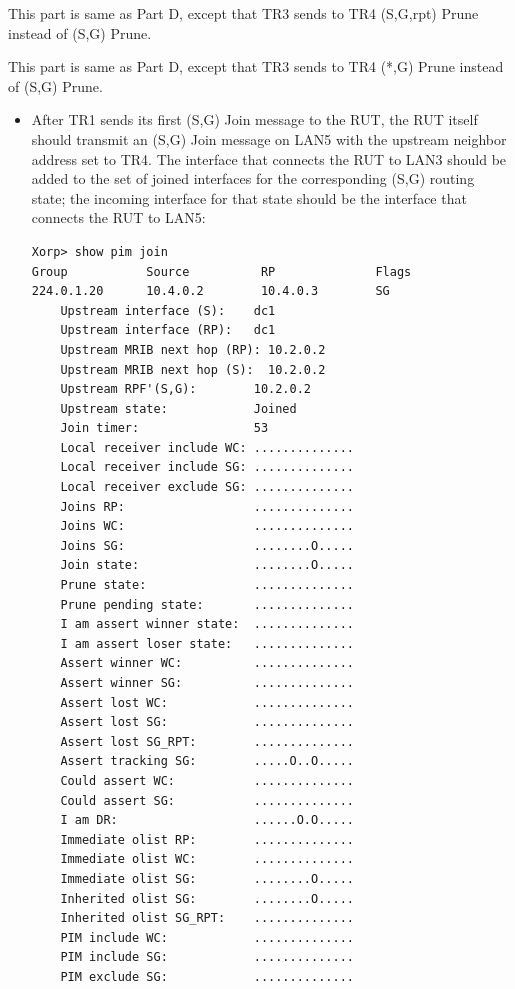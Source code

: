 \documentclass[11pt]{report}
\begin{document}

This part is same as Part D, except that TR3 sends to TR4 (S,G,rpt) Prune
instead of (S,G) Prune.


This part is same as Part D, except that TR3 sends to TR4 (*,G) Prune
instead of (S,G) Prune.



\begin{itemize}

  \item After TR1 sends its first (S,G) Join message to the RUT, the RUT
  itself should transmit an (S,G) Join message on LAN5 with the upstream
  neighbor address set to TR4. The interface that connects the RUT to LAN3
  should be added to the set of joined interfaces for the corresponding
  (S,G) routing state; the incoming interface for that state should be the
  interface that connects the RUT to LAN5:

\begin{verbatim}
Xorp> show pim join 
Group           Source          RP              Flags
224.0.1.20      10.4.0.2        10.4.0.3        SG   
    Upstream interface (S):    dc1
    Upstream interface (RP):   dc1
    Upstream MRIB next hop (RP): 10.2.0.2
    Upstream MRIB next hop (S):  10.2.0.2
    Upstream RPF'(S,G):        10.2.0.2
    Upstream state:            Joined 
    Join timer:                53
    Local receiver include WC: ..............
    Local receiver include SG: ..............
    Local receiver exclude SG: ..............
    Joins RP:                  ..............
    Joins WC:                  ..............
    Joins SG:                  ........O.....
    Join state:                ........O.....
    Prune state:               ..............
    Prune pending state:       ..............
    I am assert winner state:  ..............
    I am assert loser state:   ..............
    Assert winner WC:          ..............
    Assert winner SG:          ..............
    Assert lost WC:            ..............
    Assert lost SG:            ..............
    Assert lost SG_RPT:        ..............
    Assert tracking SG:        .....O..O.....
    Could assert WC:           ..............
    Could assert SG:           ..............
    I am DR:                   ......O.O.....
    Immediate olist RP:        ..............
    Immediate olist WC:        ..............
    Immediate olist SG:        ........O.....
    Inherited olist SG:        ........O.....
    Inherited olist SG_RPT:    ..............
    PIM include WC:            ..............
    PIM include SG:            ..............
    PIM exclude SG:            ..............
\end{verbatim}


\end{itemize}
\end{document}
